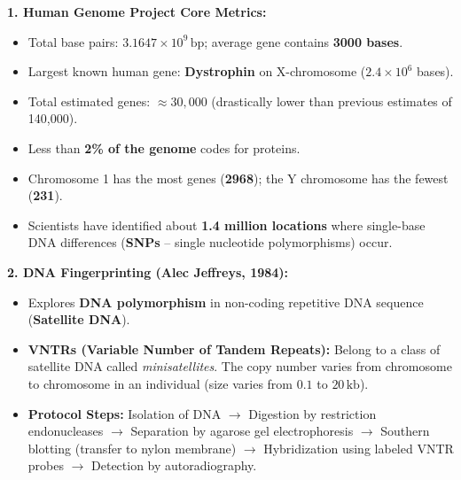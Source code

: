 \documentclass[10pt,a4paper]{article}
\begin{document}
\begin{ncertbox}
\textbf{1. Human Genome Project Core Metrics:}
\begin{itemize}
  \item Total base pairs: \textbf{$3.1647 \times 10^9\,\mathrm{bp}$}; average gene contains \textbf{3000 bases}.
  \item Largest known human gene: \textbf{Dystrophin} on X-chromosome ($2.4 \times 10^6$ bases).
  \item Total estimated genes: \textbf{$\approx 30,000$} (drastically lower than previous estimates of 140,000).
  \item Less than \textbf{2\% of the genome} codes for proteins.
  \item Chromosome 1 has the most genes (\textbf{2968}); the Y chromosome has the fewest (\textbf{231}).
  \item Scientists have identified about \textbf{1.4 million locations} where single-base DNA differences (\textbf{SNPs} -- single nucleotide polymorphisms) occur.
\end{itemize}
\textbf{2. DNA Fingerprinting (Alec Jeffreys, 1984):}
\begin{itemize}
  \item Explores \textbf{DNA polymorphism} in non-coding repetitive DNA sequence (\textbf{Satellite DNA}).
  \item \textbf{VNTRs (Variable Number of Tandem Repeats):} Belong to a class of satellite DNA called \textit{minisatellites}. The copy number varies from chromosome to chromosome in an individual (size varies from $0.1$ to $20\,\mathrm{kb}$).
  \item \textbf{Protocol Steps:} Isolation of DNA $\to$ Digestion by restriction endonucleases $\to$ Separation by agarose gel electrophoresis $\to$ Southern blotting (transfer to nylon membrane) $\to$ Hybridization using labeled VNTR probes $\to$ Detection by autoradiography.
\end{itemize}
\end{ncertbox}
\end{document}
